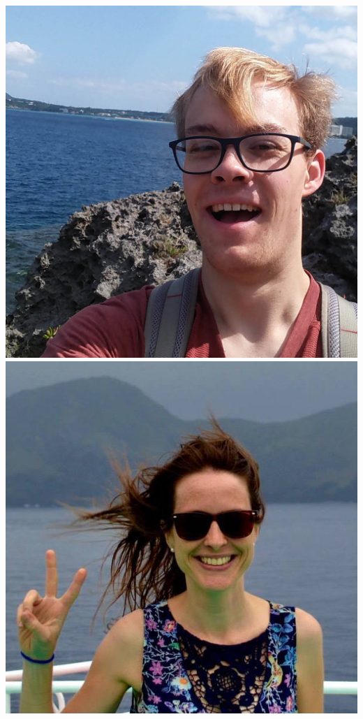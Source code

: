 \documentclass{beamer}
\begin{document}
\begin{frame}
\begin{columns}
\begin{columns}
\includegraphics[width=\textwidth]{Peter.jpg}
\includegraphics[width=\textwidth]{Angela.jpg}

\end{columns}
\end{columns}
\end{frame}
\end{document}
